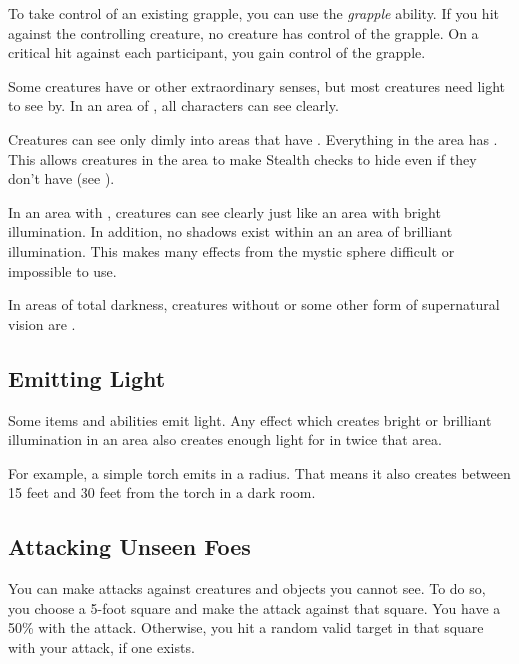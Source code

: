       To take control of an existing grapple, you can use the \textit{grapple} ability.
      If you hit against the controlling creature, no creature has control of the grapple.
      On a critical hit against each participant, you gain control of the grapple.


  Some creatures have  or other extraordinary senses, but most creatures need light to see by.
  In an area of , all characters can see clearly.

  Creatures can see only dimly into areas that have .
  Everything in the area has .
  This allows creatures in the area to make Stealth checks to hide even if they don't have  (see ).

  In an area with , creatures can see clearly just like an area with bright illumination.
  In addition, no shadows exist within an an area of brilliant illumination.
  This makes many effects from the  mystic sphere difficult or impossible to use.

  In areas of total darkness, creatures without  or some other form of supernatural vision are \blinded.

  \subsection{Emitting Light}
    Some items and abilities emit light.
    Any effect which creates bright or brilliant illumination in an area also creates enough light for  in twice that area.

    For example, a simple torch emits  in a \smallarea radius.
    That means it also creates  between 15 feet and 30 feet from the torch in a dark room.

  \subsection{Attacking Unseen Foes}
    You can make  attacks against creatures and objects you cannot see.
    To do so, you choose a 5-foot square and make the attack against that square.
    You have a 50\%  with the attack.
    Otherwise, you hit a random valid target in that square with your attack, if one exists.

